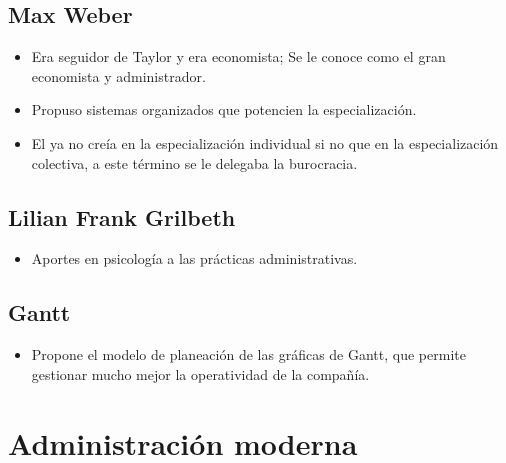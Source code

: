 \subsection{Max Weber}
\begin{itemize}
    \item Era seguidor de Taylor y era economista; Se le conoce como el gran economista y administrador.
    \item Propuso sistemas organizados que potencien la especialización.
    \item El ya no creía en la especialización individual si no que en la especialización colectiva, a este término se le delegaba la burocracia.
\end{itemize}


\subsection{Lilian Frank Grilbeth}
\begin{itemize}
    \item Aportes en psicología a las prácticas administrativas.
\end{itemize}


\subsection{Gantt}
\begin{itemize}
    \item Propone el modelo de planeación de las gráficas de Gantt, que permite gestionar mucho mejor la operatividad de la compañía.
\end{itemize}

\section{Administración moderna}

